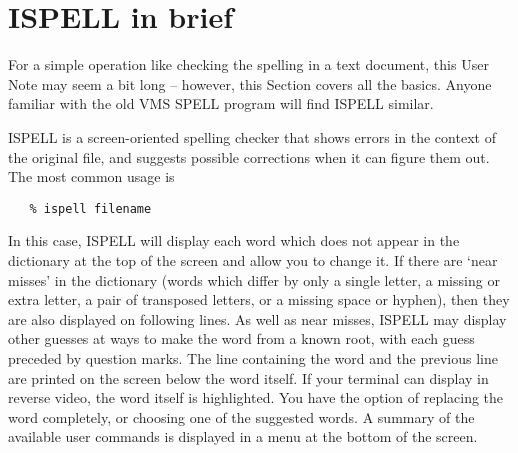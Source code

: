 \documentclass[twoside,11pt]{article}
\newcommand{\stardocinitials}  {SUN}
\newcommand{\stardocnumber}    {189.3}
\newcommand{\stardocabstract}  {[Text of abstract]}
\newcommand{\stardocname}{\stardocinitials /\stardocnumber}
\newenvironment{latexonly}{}{}
\newcommand{\sunspec}[2]{#1}
\newcommand{\sunspec}[2]{#2}
\renewcommand{\thepage}{\roman{page}}
\begin{document}
\newpage
\begin{latexonly}
   \setlength{\parskip}{0mm}
   \tableofcontents
   \setlength{\parskip}{\medskipamount}
   \markright{\stardocname}
\end{latexonly}
\newpage
\renewcommand{\thepage}{\arabic{page}}
\setcounter{page}{1}

\section{ISPELL in brief}

For a simple operation like checking the spelling in a text document, this User
Note may seem a bit long \sunspec{--}{-} however, this Section covers all the 
basics. 
Anyone familiar with the old VMS SPELL program will find ISPELL similar.

ISPELL is a screen-oriented spelling checker that shows errors in the context
of the original file, and suggests possible corrections when it can figure
them out.  The most common usage is

\begin{verbatim}
   % ispell filename
\end{verbatim}

In this case, ISPELL will display each word which does not appear in the
dictionary at the top of the screen and allow you to change it.
If there are `near misses' in the dictionary (words which differ by only a
single letter, a missing or extra letter, a pair of transposed letters, or a
missing space or hyphen), then they are also displayed on following lines.
As well as near misses, ISPELL may display other guesses at ways to make the
word from a known root, with each guess preceded by question marks.
The line containing the word and the previous line
are printed on the screen below the word itself. If your terminal can
display in reverse video, the word itself is highlighted.  You have the
option of replacing the word completely, or choosing one of the suggested
words.  A summary of the available user commands is displayed in a menu at the
bottom of the screen.
\end{document}
